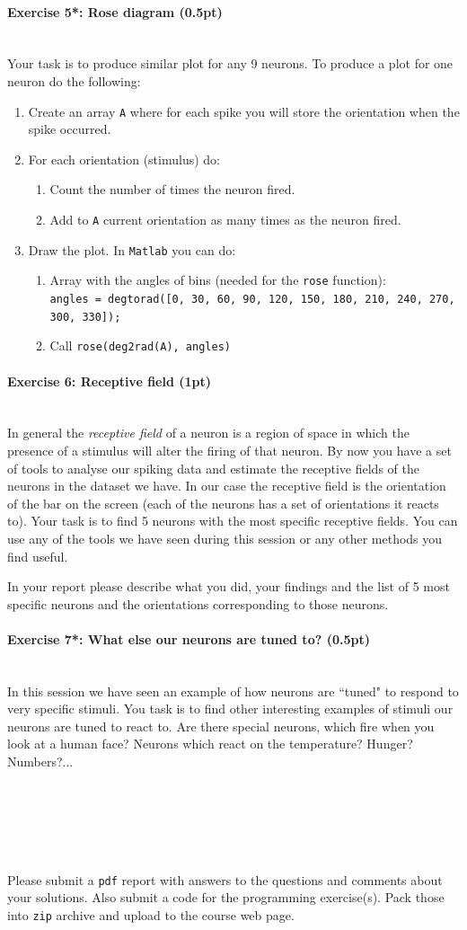 \documentclass[a4paper,11pt]{article}
\newenvironment{exercise}[3]{\paragraph{Exercise #1: #2 (#3pt)}\ \\}{
\medskip}
\begin{document}
\begin{exercise}{5*}{Rose diagram}{0.5}
Your task is to produce similar plot for any 9 neurons. To produce a plot for one neuron do the following:
\begin{enumerate}
	\item Create an array \texttt{A} where for each spike you will store the orientation when the spike occurred.
	\item For each orientation (stimulus) do:
	\begin{enumerate}
		\item Count the number of times the neuron fired.
		\item Add to \texttt{A} current orientation as many times as the neuron fired.
	\end{enumerate}
	\item Draw the plot. In \texttt{Matlab} you can do:
	\begin{enumerate}
		\item Array with the angles of bins (needed for the \texttt{rose} function):\\ \texttt{angles = degtorad([0, 30, 60, 90, 120, 150, 180, 210, 240, 270, 300, 330]);}
		\item Call \texttt{rose(deg2rad(A), angles)}
	\end{enumerate}
\end{enumerate}
\end{exercise}


\begin{exercise}{6}{Receptive field}{1}
In general the \emph{receptive field} of a neuron is a region of space in which the presence of a stimulus will alter the firing of that neuron. By now you have a set of tools to analyse our spiking data and estimate the receptive fields of the neurons in the dataset we have. In our case the receptive field is the orientation of the bar on the screen (each of the neurons has a set of orientations it reacts to). Your task is to find 5 neurons with the most specific receptive fields. You can use any of the tools we have seen during this session or any other methods you find useful.

In your report please describe what you did, your findings and the list of 5 most specific neurons and the orientations corresponding to those neurons.
\end{exercise}


\begin{exercise}{7*}{What else our neurons are tuned to?}{0.5}
In this session we have seen an example of how neurons are ``tuned" to respond to very specific stimuli. You task is to find  other interesting examples of stimuli our neurons are tuned to react to. Are there special neurons, which fire when you look at a human face? Neurons which react on the temperature? Hunger? Numbers?...
\end{exercise}



\ \\
\ \\
\ \\
\ \\
\ \\
Please submit a \texttt{pdf} report with answers to the questions and comments about your solutions. Also submit a code for the programming exercise(s). Pack those into \texttt{zip} archive and upload to the course web page.
\end{document}
